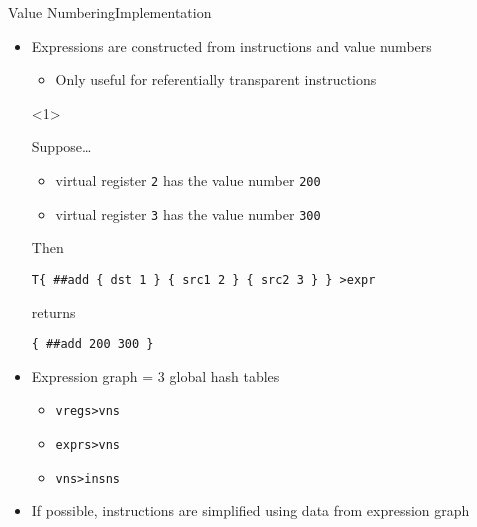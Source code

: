 \documentclass{beamer}
\begin{document}
\begin{frame}[fragile,t]{Value Numbering}{Implementation}
  \begin{itemize}
    \item \alert{Expressions} are constructed from instructions and value numbers
    \begin{itemize}
      \item Only useful for \alert{referentially transparent} instructions
    \end{itemize}
    \begin{onlyenv}<1>
    \begin{example}
      Suppose\ldots
      \begin{itemize}
        \item virtual register \texttt{2} has the value number \texttt{200}
        \item virtual register \texttt{3} has the value number \texttt{300}
      \end{itemize}
      Then
      \begin{Verbatim}
T{ ##add { dst 1 } { src1 2 } { src2 3 } } >expr
      \end{Verbatim}
      returns
      \begin{Verbatim}
{ ##add 200 300 }
      \end{Verbatim}
    \end{example}
    \end{onlyenv}
    \pause
    \item \alert{Expression graph} = 3 global hash tables
    \begin{itemize}
      \item \texttt{vregs>vns}
      \item \texttt{exprs>vns}
      \item \texttt{vns>insns}
    \end{itemize}
    \item If possible, instructions are simplified using data from expression
    graph
  \end{itemize}
\end{frame}
\end{document}
